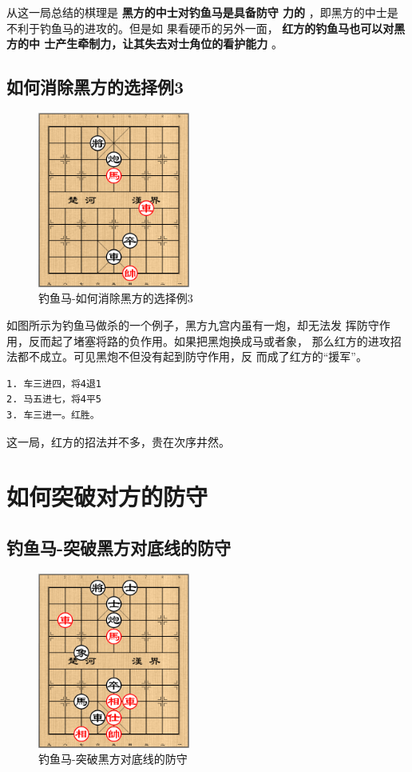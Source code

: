 \documentclass[a5paper,twoside]{book}
\begin{document}
从这一局总结的棋理是 \textbf{黑方的中士对钓鱼马是具备防守
力的} ，即黑方的中士是不利于钓鱼马的进攻的。但是如
果看硬币的另外一面， \textbf{红方的钓鱼马也可以对黑方的中
士产生牵制力，让其失去对士角位的看护能力} 。


\subsection{如何消除黑方的选择例3}
\label{sec-3-3-3}
\begin{figure}[H]
\centering
\includegraphics[width=5cm]{pic/钓鱼马-如何消除黑方的选择再一例.png}
\caption{钓鱼马-如何消除黑方的选择例3}
\end{figure}

如图所示为钓鱼马做杀的一个例子，黑方九宫内虽有一炮，却无法发
挥防守作用，反而起了堵塞将路的负作用。如果把黑炮换成马或者象，
那么红方的进攻招法都不成立。可见黑炮不但没有起到防守作用，反
而成了红方的“援军”。

\begin{verbatim}
1. 车三进四，将4退1
2. 马五进七，将4平5
3. 车三进一。红胜。
\end{verbatim}

这一局，红方的招法并不多，贵在次序井然。

\section{如何突破对方的防守}
\label{sec-3-4}
\subsection{钓鱼马-突破黑方对底线的防守}
\label{sec-3-4-1}
\begin{figure}[H]
\centering
\includegraphics[width=5cm]{pic/钓鱼马-突破黑方对底线的防守.png}
\caption{钓鱼马-突破黑方对底线的防守}
\end{figure}
\end{document}
